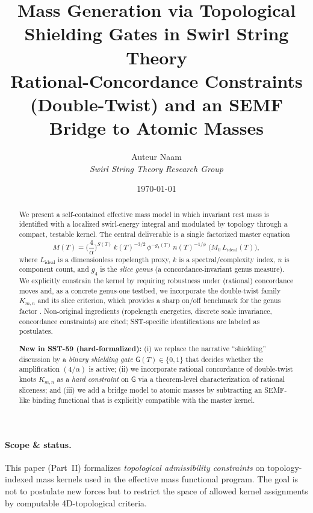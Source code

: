 \documentclass[11pt, a4paper]{article}
\title{\textbf{Mass Generation via Topological Shielding Gates in Swirl String Theory}\\
\large Rational-Concordance Constraints (Double-Twist) and an SEMF Bridge to Atomic Masses}
\author{Auteur Naam \\ \textit{Swirl String Theory Research Group}}
\date{\today}
\begin{document}
\maketitle

\begin{abstract}
We present a self-contained effective mass model in which invariant rest mass is identified with a localized swirl-energy integral and modulated by topology through a compact, testable kernel. The central deliverable is a single factorized master equation
\[
M(T)=\Big(\frac{4}{\alpha}\Big)^{S(T)}\,k(T)^{-3/2}\,\phi^{-g_4(T)}\,n(T)^{-1/\phi}\;\Big(M_0\,L_{\mathrm{ideal}}(T)\Big),
\]
where \(L_{\mathrm{ideal}}\) is a dimensionless ropelength proxy, \(k\) is a spectral/complexity index, \(n\) is component count, and \(g_4\) is the \emph{slice genus} (a concordance-invariant genus measure). We explicitly constrain the kernel by requiring robustness under (rational) concordance moves and, as a concrete genus-one testbed, we incorporate the double-twist family \(K_{m,n}\) and its slice criterion, which provides a sharp on/off benchmark for the genus factor \cite{Lee2025DoubleTwist}. Non-original ingredients (ropelength energetics, discrete scale invariance, concordance constraints) are cited; SST-specific identifications are labeled as postulates.
\par\smallskip
\textbf{New in SST-59 (hard-formalized):} (i) we replace the narrative ``shielding'' discussion by a \emph{binary shielding gate}
\(\mathsf{G}(T)\in\{0,1\}\) that decides whether the amplification \((4/\alpha)\) is active; (ii) we incorporate rational concordance of
double-twist knots \(K_{m,n}\) as a \emph{hard constraint} on \(\mathsf{G}\) via a theorem-level characterization of rational sliceness; and
(iii) we add a bridge model to atomic masses by subtracting an SEMF-like binding functional that is explicitly compatible with the master kernel.
\end{abstract}

\paragraph{Scope \& status.}
This paper (Part~II) formalizes \emph{topological admissibility constraints} on topology-indexed mass kernels used in the effective mass functional program. The goal is not to postulate new forces but to restrict the space of allowed kernel assignments by computable 4D-topological criteria.
\end{document}
